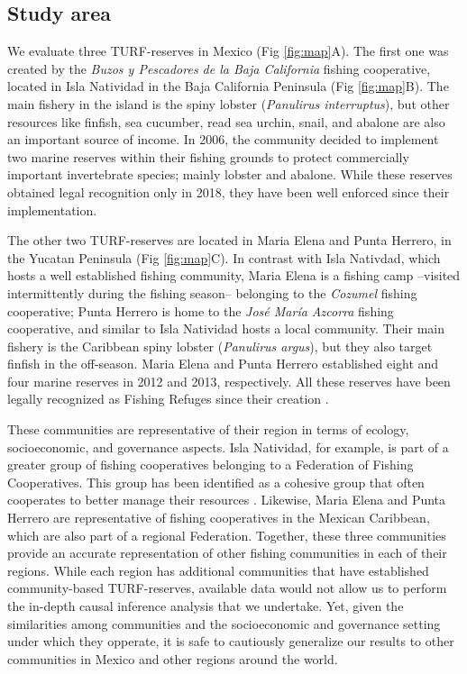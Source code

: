 \documentclass{frontiersSCNS}
\theoremstyle{definition}
\theoremstyle{definition}
\theoremstyle{definition}
\theoremstyle{remark}
\begin{document}
\subsection{Study area}\label{study-area}

We evaluate three TURF-reserves in Mexico (Fig \ref{fig:map}A). The
first one was created by the \emph{Buzos y Pescadores de la Baja
California} fishing cooperative, located in Isla Natividad in the Baja
California Peninsula (Fig \ref{fig:map}B). The main fishery in the
island is the spiny lobster (\emph{Panulirus interruptus}), but other
resources like finfish, sea cucumber, read sea urchin, snail, and
abalone are also an important source of income. In 2006, the community
decided to implement two marine reserves within their fishing grounds to
protect commercially important invertebrate species; mainly lobster and
abalone. While these reserves obtained legal recognition only in 2018,
they have been well enforced since their implementation.

The other two TURF-reserves are located in Maria Elena and Punta
Herrero, in the Yucatan Peninsula (Fig \ref{fig:map}C). In contrast with
Isla Nativdad, which hosts a well established fishing community, Maria
Elena is a fishing camp --visited intermittently during the fishing
season-- belonging to the \emph{Cozumel} fishing cooperative; Punta
Herrero is home to the \emph{José María Azcorra} fishing cooperative,
and similar to Isla Natividad hosts a local community. Their main
fishery is the Caribbean spiny lobster (\emph{Panulirus argus}), but
they also target finfish in the off-season. Maria Elena and Punta
Herrero established eight and four marine reserves in 2012 and 2013,
respectively. All these reserves have been legally recognized as Fishing
Refuges since their creation \citep{dof_website_2012,dof_website_2013}.

These communities are representative of their region in terms of
ecology, socioeconomic, and governance aspects. Isla Natividad, for
example, is part of a greater group of fishing cooperatives belonging to
a Federation of Fishing Cooperatives. This group has been identified as
a cohesive group that often cooperates to better manage their resources
\citep{mccay_2017-1m,mccay_2014-CN,acevesbueno_2017}. Likewise, Maria
Elena and Punta Herrero are representative of fishing cooperatives in
the Mexican Caribbean, which are also part of a regional Federation.
Together, these three communities provide an accurate representation of
other fishing communities in each of their regions. While each region
has additional communities that have established community-based
TURF-reserves, available data would not allow us to perform the in-depth
causal inference analysis that we undertake. Yet, given the similarities
among communities and the socioeconomic and governance setting under
which they opperate, it is safe to cautiously generalize our results to
other communities in Mexico and other regions around the world.
\end{document}
